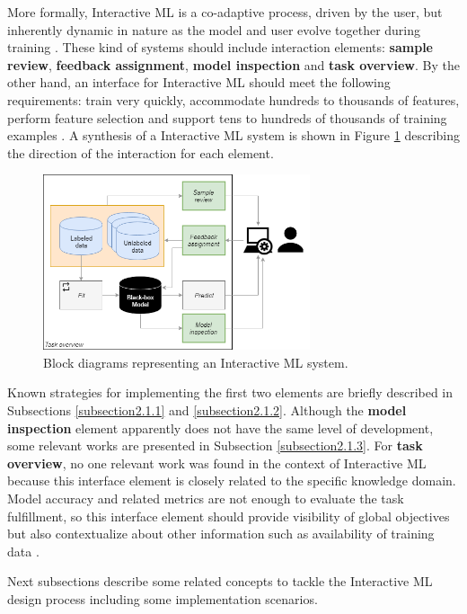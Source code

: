 More formally, Interactive ML is a co-adaptive process, driven by the user, but inherently dynamic in nature as the model and user evolve together during training \cite{Dudley2018}. These kind of systems should include interaction elements: \textbf{sample review}, \textbf{feedback assignment}, \textbf{model inspection} and \textbf{task overview}. By the other hand, an interface for Interactive ML should meet the following requirements: train very quickly, accommodate hundreds to thousands of features, perform feature selection and support tens to hundreds of thousands of training examples \cite{Fails2003}. A synthesis of a Interactive ML system is shown in Figure \ref{fig:InteractiveML} describing the direction of the interaction for each element. 

\begin{figure}[ht]
 \centering
 \includegraphics[width=0.7\textwidth]{InteractiveML.png}
 \caption{Block diagrams representing an Interactive ML system.}
 \label{fig:InteractiveML}
\end{figure}

Known strategies for implementing the first two elements are briefly described in Subsections \ref{subsection2.1.1} and \ref{subsection2.1.2}. Although the \textbf{model inspection} element apparently does not have the same level of development, some relevant works are presented in Subsection \ref{subsection2.1.3}. For \textbf{task overview}, no one relevant work was found in the context of Interactive ML because this interface element is closely related to the specific knowledge domain. Model accuracy and related metrics are not enough to evaluate the task fulfillment, so this interface element should provide visibility of global objectives but also contextualize about other information such as availability of training data \cite{Dudley2018}.

Next subsections describe some related concepts to tackle the Interactive ML design process including some implementation scenarios.

